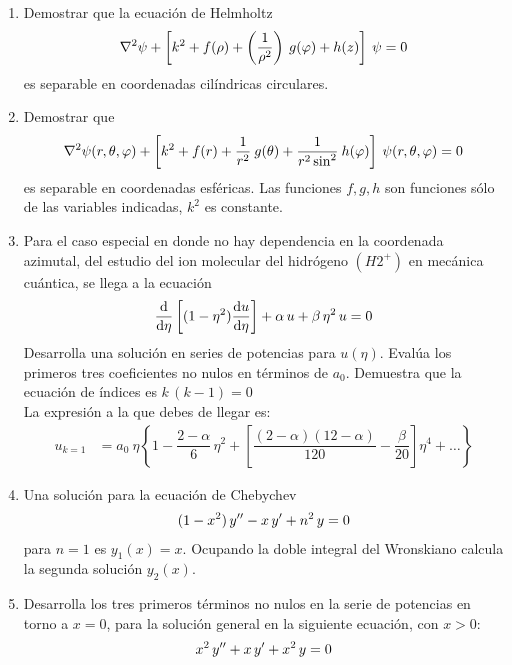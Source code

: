 \begin{enumerate}
\item Demostrar que la ecuación de Helmholtz
\begin{align*}
\laplacian \psi + \left[ k^{2} + f(\rho) + \left( \dfrac{1}{\rho^{2}} \right) \: g(\varphi) + h(z) \right] \: \psi = 0
\end{align*}
es separable en coordenadas cilíndricas circulares.
\item Demostrar que
\begin{align*}
\laplacian \psi (r, \theta, \varphi) + \left[ k^{2} + f(r) + \dfrac{1}{r^{2}} \: g(\theta) + \dfrac{1}{r^{2} \sin^{2}} \: h(\varphi) \right] \: \psi (r, \theta, \varphi) = 0
\end{align*}
es separable en coordenadas esféricas. Las funciones $f, g, h$ son funciones sólo de las variables indicadas, $k^{2}$ es constante.
\item Para el caso especial en donde no hay dependencia en la coordenada azimutal, del estudio del ion molecular del hidrógeno $(H2^{+})$ en mecánica cuántica, se llega a la ecuación
\begin{align*}
\dv{\eta} \left[ (1 - \eta^{2} ) \dv{u}{\eta} \right] + \alpha \, u + \beta \, \eta^{2} \, u = 0
\end{align*}
Desarrolla una solución en series de potencias para $u(\eta)$. Evalúa los primeros tres coeficientes no nulos en términos de $a_{0}$. Demuestra que la ecuación de índices es $k \, (k - 1) = 0$
\\
La expresión a la que debes de llegar es:
\begin{align*}
u_{k=1} &=  a_{0} \: \eta \left\lbrace 1 - \dfrac{2- \alpha}{6} \, \eta^{2} + \left[ \dfrac{(2-\alpha)(12-\alpha)}{120} - \dfrac{\beta}{20} \right] \eta^{4} + \ldots \right\rbrace
\end{align*}
\item Una solución para la ecuación de Chebychev
\begin{align*}
(1 -x^{2}) \, {y}^{\prime \prime} - x \, {y}^{\prime} + n^{2} \, y = 0
\end{align*}
para $n = 1$ es $y_{1}(x) = x$. Ocupando la doble integral del Wronskiano calcula la segunda solución $y_{2}(x)$.
\item Desarrolla los tres primeros términos no nulos en la serie de potencias en torno a $x = 0$, para la solución general en la siguiente ecuación, con $x > 0$:
\begin{align*}
x^{2} \, {y}^{\prime \prime} + x \, {y}^{\prime} + x^{2} \, y = 0
\end{align*}

\end{enumerate}
